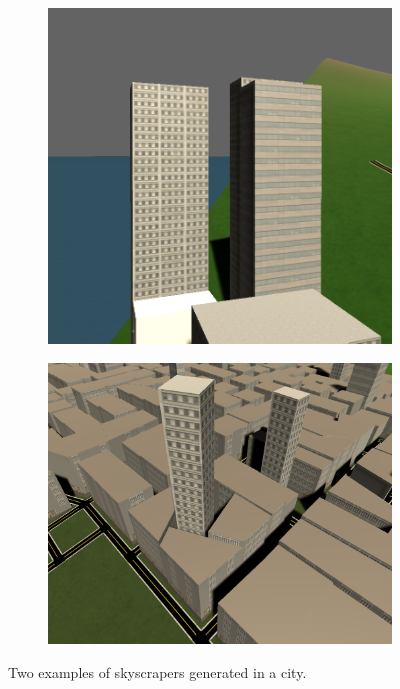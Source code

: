 \begin{figure}[H]
  \centering

  \begin{subfigure}[b]{0.45\textwidth}
    \includegraphics[width=\textwidth]{figure/skyscraper-close-up.PNG}
  \end{subfigure}
  \quad
  \begin{subfigure}[b]{0.45\textwidth}
    \includegraphics[width=\textwidth]{figure/wack.PNG}
  \end{subfigure}

  \caption{Two examples of skyscrapers generated in a city.}
  \label{fig:skyscraper-result}
\end{figure}

